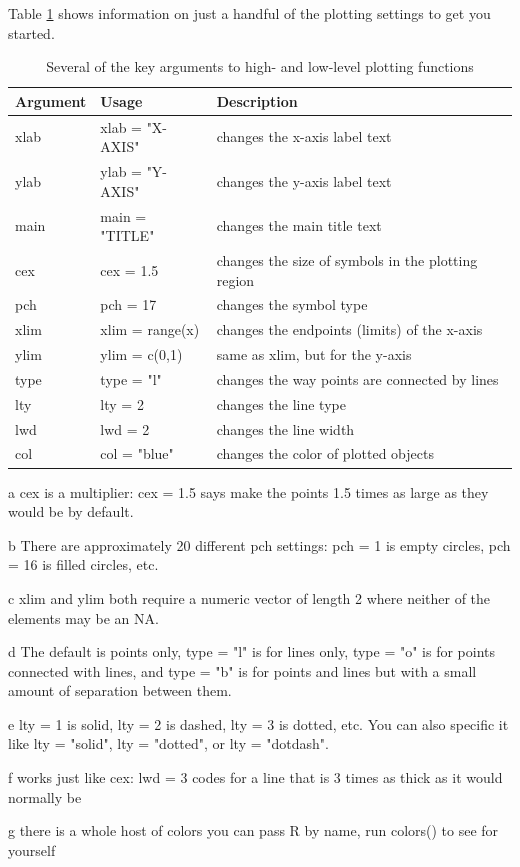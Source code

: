 \documentclass[]{book}
\begin{document}
Table \ref{tab:plot-arg-table-pdf} shows information on just a handful of the plotting settings to get you started.

\begin{table}[t]

\caption{\label{tab:plot-arg-table-pdf}Several of the key arguments to high- and low-level plotting functions}
\centering
\begin{threeparttable}
\begin{tabular}{>{\ttfamily}l>{\ttfamily}l>{\raggedright\arraybackslash}p{25em}}
\toprule
Argument & Usage & Description\\
\midrule
xlab & xlab = "X-AXIS" & changes the x-axis label text\\
ylab & ylab = "Y-AXIS" & changes the y-axis label text\\
main & main = "TITLE" & changes the main title text\\
cex & cex = 1.5 & changes the size of symbols in the plotting region\\
pch & pch = 17 & changes the symbol type\\
\addlinespace
xlim & xlim = range(x) & changes the endpoints (limits) of the x-axis\\
ylim & ylim = c(0,1) & same as xlim, but for the y-axis\\
type & type = "l" & changes the way points are connected by lines\\
lty & lty = 2 & changes the line type\\
lwd & lwd = 2 & changes the line width\\
\addlinespace
col & col = "blue" & changes the color of plotted objects\\
\bottomrule
\end{tabular}
\begin{tablenotes}
\item[a] cex is a multiplier: cex = 1.5 says make the points 1.5 times as large as they would be by default.
\item[b] There are approximately 20 different pch settings: pch = 1 is empty circles, pch = 16 is filled circles, etc.
\item[c] xlim and ylim both require a numeric vector of length 2 where neither of the elements may be an NA.
\item[d] The default is points only, type = "l" is for lines only, type = "o" is for points connected with lines, and type = "b" is for points and lines but with a small amount of separation between them.
\item[e] lty = 1 is solid, lty = 2 is dashed, lty = 3 is dotted, etc. You can also specific it like lty = "solid", lty = "dotted", or lty = "dotdash".
\item[f] works just like cex: lwd = 3 codes for a line that is 3 times as thick as it would normally be
\item[g] there is a whole host of colors you can pass R by name, run colors() to see for yourself
\end{tablenotes}
\end{threeparttable}
\end{table}
\end{document}

